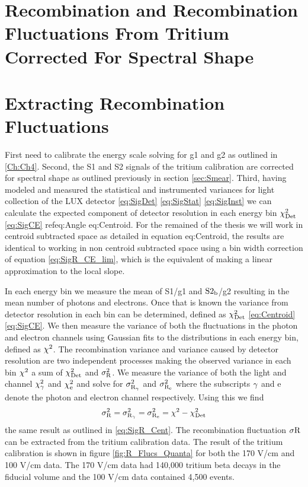 \section{Recombination and Recombination Fluctuations From Tritium Corrected For Spectral Shape}


\section{Extracting Recombination Fluctuations}

First need to calibrate the energy scale solving for g1 and g2 as outlined in \ref{Ch:Ch4}. Second, the S1 and S2 signals of the tritium calibration are corrected for spectral shape as outlined previously in section \ref{sec:Smear}. Third, having modeled and measured the statistical and instrumented variances for light collection of the LUX detector \ref{eq:SigDet} \ref{eq:SigStat} \ref{eq:SigInst} we can calculate the expected component of detector resolution in each energy bin $\rm \chi_{Det}^2$ \ref{eq:SigCE} ref{eq:Angle} {eq:Centroid}. For the remained of the thesis we will work in centroid subtracted space as detailed in equation {eq:Centroid}, the results are identical to working in non centroid subtracted space using a bin width correction of equation \ref{eq:SigR_CE_lim}, which is the equivalent of making a linear approximation to the local slope.  


In each energy bin we measure the mean of S1/g1 and $\rm S2_b$/g2 resulting in the mean number of photons and electrons. Once that is known the variance from detector resolution in each bin can be determined, defined as $\rm \chi_{Det}^2$ \ref{eq:Centroid} \ref{eq:SigCE}. We then measure the variance of both the fluctuations in the photon and electron channels using Gaussian fits to the distributions in each energy bin, defined as $\rm \chi^2$. The recombination variance and variance caused by detector resolution are two independent processes making the observed variance in each bin $\rm \chi^2$ a sum of $\rm \chi_{Det}^2$ and $\rm \sigma_R^2$. We measure the variance of both the light and channel $\rm \chi_{\gamma}^2$ and $\rm \chi_e^2$ and solve for $\rm \sigma_{R_\gamma}^2$ and $\rm \sigma_{R_e}^2$ where the subscripts $\rm \gamma$ and e denote the photon and electron channel respectively. Using this we find
\begin{equation}
\rm \sigma_R^2 = \sigma_{R_\gamma}^2 = \sigma_{R_e}^2 = \chi^2-\chi_{Det}^2
\end{equation}
\noindent the same result as outlined in \ref{eq:SigR_Cent}. The recombination fluctuation $\rm \sigma R$ can be extracted from the tritium calibration data. The result of the tritium calibration is shown in figure \ref{fig:R_Flucs_Quanta} for both the 170 V/cm and 100 V/cm data. The 170 V/cm data had 140,000 tritium beta decays in the fiducial volume and the 100 V/cm data contained 4,500 events. 

